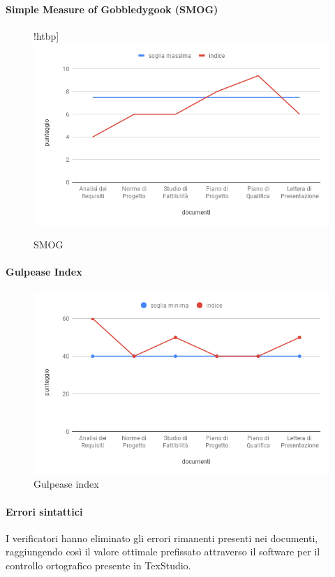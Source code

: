 \paragraph{Simple Measure of Gobbledygook (SMOG)}
\hspace{15cm}
\begin{figure}!htbp]
	\centering
	\includegraphics[scale=0.5]{Smog.png}
	\caption{SMOG}
\end{figure}
\clearpage
\paragraph{Gulpease Index}
\hspace{15cm}
\begin{figure}[!htbp]
	\centering
	\includegraphics[scale=0.5]{GulpeaseIndex.png}
	\caption{Gulpease index}
\end{figure}

\paragraph{Errori sintattici}
\hspace{15cm}
 I verificatori hanno eliminato gli errori rimanenti presenti nei documenti, raggiungendo così il valore ottimale prefissato attraverso il software per il controllo ortografico presente in TexStudio. 

